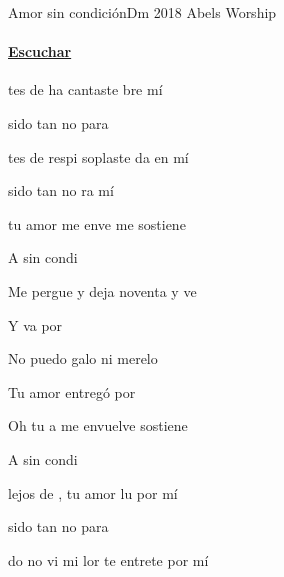 \documentclass[12pt, spanish]{book}
\begin{document}
    \begin{song}{Amor sin condición}{Dm}
        {2018} %
        {Abels Worship}
        {} %
        {}
        \ifChordBk
        \paragraph{\mbox{}\hfill\protect\href{https://open.spotify.com/intl-es/track/476YR336qlbI46CMTuPSh7}{Escuchar}\mbox{}\hfill}
        \fi


        \begin{SBOpGroup}
            tes de ha cantaste bre mí

             sido tan no para 

            tes de respi soplaste da en mí

             sido tan no ra mí
        \end{SBOpGroup}

        \begin{SBChorus}
             tu amor me enve me sostiene

            A sin condi

            Me pergue y deja  noventa y ve

            Y va por 

            No puedo galo ni merelo

            Tu amor  entregó por 

            Oh tu a me envuelve  sostiene

            A sin condi
        \end{SBChorus}

        \begin{SBOpGroup}
             lejos de , tu amor lu por mí

             sido tan no para 

            do no vi mi lor te entrete por mí


\end{SBOpGroup}
\end{song}
\end{document}
